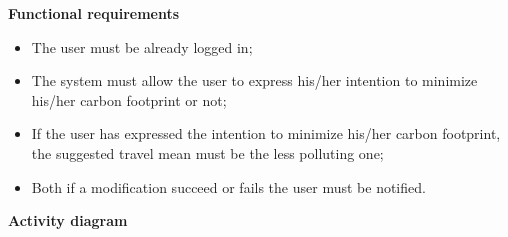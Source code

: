 \documentclass{article}
\begin{document}
	\bigskip
	\noindent
	\textbf{Functional requirements} \\
	\begin{itemize}
		\item The user must be already logged in;
		\item The system must allow the user to express his/her intention to minimize his/her carbon footprint or not;
		\item If the user has expressed the intention to minimize his/her carbon footprint, the suggested travel mean must be the less polluting one;
		\item Both if a modification succeed or fails the user must be notified.
	\end{itemize}
	
	\newpage
	\noindent
	\textbf{Activity diagram} \\
	
\end{document}
